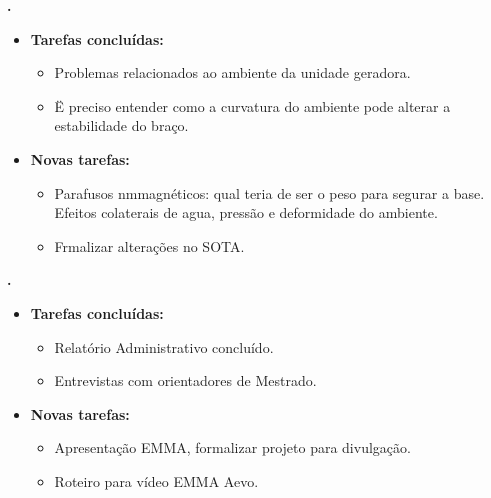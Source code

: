 \textbf{\gabriel.} 
	\begin{itemize}
		\item \textbf{Tarefas concluídas:}
			\begin{itemize}    
				\item Problemas relacionados ao ambiente da unidade geradora.
				\item Ë preciso entender como a curvatura do ambiente pode alterar a
				estabilidade do braço.
			\end{itemize}
		\item \textbf{Novas tarefas:}
			\begin{itemize}
				\item Parafusos nmmagnéticos: qual teria de ser o peso para segurar a base.
				Efeitos colaterais de agua, pressão e deformidade do ambiente.
				\item Frmalizar alterações no SOTA.		
			\end{itemize}
	\end{itemize}
	
\textbf{\julia.} 
	\begin{itemize}
		\item \textbf{Tarefas concluídas:}
			\begin{itemize}    
				\item Relatório Administrativo concluído.
				\item Entrevistas com orientadores de Mestrado. 
			\end{itemize}
		\item \textbf{Novas tarefas:}
			\begin{itemize}
				\item Apresentação EMMA, formalizar  projeto para divulgação.
				\item Roteiro para vídeo EMMA Aevo.
			\end{itemize}
	\end{itemize}


